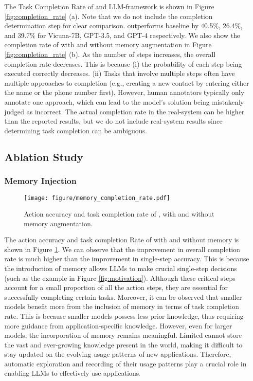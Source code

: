 The Task Completion Rate of \name and LLM-framework \cite{talking_with_ui} is shown in Figure \ref{fig:completion_rate} (a). Note that we do not include the completion determination step for clear comparison. \name outperforms baseline by 40.5\%, 26.4\%, and 39.7\% for Vicuna-7B, GPT-3.5, and GPT-4 respectively. We also show the completion rate of \name with and without memory augmentation in Figure \ref{fig:completion_rate} (b). As the number of steps increases, the overall completion rate decreases. This is because (i) the probability of each step being executed correctly decreases. (ii) Tasks that involve multiple steps often have multiple approaches to completion (e.g., creating a new contact by entering either the name or the phone number first). However, human annotators typically only annotate one approach, which can lead to the model's solution being mistakenly judged as incorrect. The actual completion rate in the real-system can be higher than the reported results, but we do not include real-system results since determining task completion can be ambiguous.

\subsection{Ablation Study}
\label{eval:ablation}
\subsubsection{Memory Injection}
\begin{figure}
    \centering
    \texttt{[image: figure/memory\_completion\_rate.pdf]}
    \vspace{-0.4cm}
    \caption{Action accuracy and task completion rate of \name, with and without memory augmentation.}
    \label{fig:ablation_memory}
    \vspace{-0.2cm}
\end{figure}
The action accuracy and task completion Rate of \name with and without memory is shown in Figure \ref{fig:ablation_memory}. We can observe that the improvement in overall completion rate is much higher than the improvement in single-step accuracy. This is because the introduction of memory allows LLMs to make crucial single-step decisions (such as the example in Figure \ref{fig:motivation}). Although these critical steps account for a small proportion of all the action steps, they are essential for successfully completing certain tasks.
Moreover, it can be observed that smaller models benefit more from the inclusion of memory in terms of task completion rate. This is because smaller models possess less prior knowledge, thus requiring more guidance from application-specific knowledge. However, even for larger models, the incorporation of memory remains meaningful. Limited  cannot store the vast and ever-growing knowledge present in the world, making it difficult to stay updated on the evolving usage patterns of new applications. Therefore, automatic exploration and recording of their usage patterns play a crucial role in enabling LLMs to effectively use applications.

